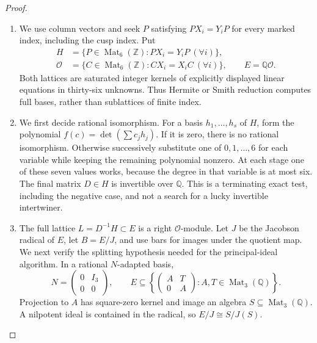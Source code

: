 \begin{proof}
\begin{enumerate}[label=\arabic*.]
\item We use column vectors and seek $P$ satisfying $PX_i=Y_iP$ for every
marked index, including the cusp index. Put
\[
\begin{aligned}
 H&=\{P\in\operatorname{Mat}_6(\mathbb Z):PX_i=Y_iP\ (\forall i)\},\\
 \mathcal O&=\{C\in\operatorname{Mat}_6(\mathbb Z):CX_i=X_iC\ (\forall i)\},
 \qquad E=\mathbb Q\mathcal O.
\end{aligned}                                                    \tag{F.IC1}\label{maps:eq:F.IC1}
\]
Both lattices are saturated integer kernels of explicitly displayed
linear equations in thirty-six unknowns. Thus Hermite or Smith
reduction computes full bases, rather than sublattices of finite index.

\item We first decide rational isomorphism. For a basis $h_1,\ldots,h_s$ of
$H$, form the polynomial $f(c)=\det(\sum c_jh_j)$. If it is zero,
there is no rational isomorphism. Otherwise successively substitute
one of $0,1,\ldots,6$ for each variable while keeping the remaining
polynomial nonzero. At each stage one of these seven values works,
because the degree in that variable is at most six. The final matrix
$D\in H$ is invertible over $\mathbb Q$. This is a terminating exact
test, including the negative case, and not a search for a lucky
invertible intertwiner.

\item The full lattice $L=D^{-1}H\subset E$ is a right $\mathcal O$-module.
Let $J$ be the Jacobson radical of $E$, let $B=E/J$, and use bars
for images under the quotient map. We next verify the splitting
hypothesis needed for the principal-ideal algorithm. In a rational
$N$-adapted basis,
\[
 N=\begin{pmatrix}0&I_3\\0&0\end{pmatrix},\qquad
 E\subseteq
 \left\{\begin{pmatrix}A&T\\0&A\end{pmatrix}:A,T\in
                                      \operatorname{Mat}_3(\mathbb Q)\right\}.
                                                               \tag{F.IC2}\label{maps:eq:F.IC2}
\]
Projection to $A$ has square-zero kernel and image an algebra
$S\subseteq\operatorname{Mat}_3(\mathbb Q)$. A nilpotent ideal is
contained in the radical, so $E/J\cong S/J(S)$.


\end{enumerate}
\end{proof}
